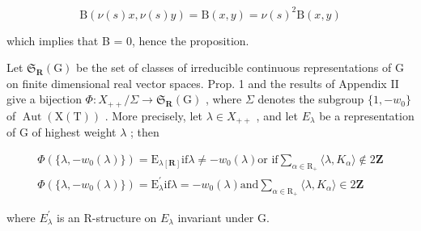 \[
\mathrm{B} (\nu (s) x, \nu (s) y) = \mathrm{B} (x, y) = \nu (s) ^ {2} \mathrm{B} (x, y)
\]

which implies that B = 0, hence the proposition.

Let \(\mathfrak{S}_{\mathbf{R}}(\mathrm{G})\) be the set of classes of irreducible continuous representations of G on finite dimensional real vector spaces. Prop. 1 and the results of Appendix II give a bijection \(\Phi:X_{++}/\Sigma\to\mathfrak{S}_{\mathbf{R}}(\mathrm{G})\) , where \(\Sigma\) denotes the subgroup \(\{1,-w_{0}\}\) of \(\operatorname{Aut}(\mathrm{X}(\mathrm{T}))\) . More precisely, let \(\lambda\in X_{++}\) , and let \(E_{\lambda}\) be a representation of G of highest weight \(\lambda\) ; then

\[
\begin{array}{c} \Phi (\{\lambda , - w _ {0} (\lambda) \}) = \mathrm{E} _ {\lambda [ \mathbf {R} ]} \text {if} \lambda \neq - w _ {0} (\lambda) \text {or if} \sum_ {\alpha \in \mathrm{R} _ {+}} \langle \lambda , K _ {\alpha} \rangle \notin 2 \mathbf {Z} \\ \Phi (\{\lambda , - w _ {0} (\lambda) \}) = \mathrm{E} _ {\lambda} ^ {\prime} \text {if} \lambda = - w _ {0} (\lambda) \text {and} \sum_ {\alpha \in \mathrm{R} _ {+}} \langle \lambda , K _ {\alpha} \rangle \in 2 \mathbf {Z} \end{array}
\]

where \(E_{\lambda}^{\prime}\) is an R-structure on \(E_{\lambda}\) invariant under G.

